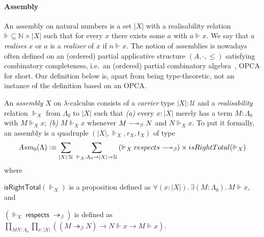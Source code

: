 \documentclass[a4paper,UKenglish,numberwithinsect,cleveref,thm-restate]{lipics-v2021}
\newcommand{\Asm}{\mathsf{Asm}}
\newcommand{\defeq}{\vcentcolon\equiv}
\newcommand{\Univ}{\mathcal{U}}
\DeclareRobustCommand\longtwoheadrightarrow{\relbar\joinrel\twoheadrightarrow}
\newcommand{\reduce}{\longtwoheadrightarrow_{\beta}}
\theoremstyle{plain}
\begin{document}
\paragraph*{Assembly}
An assembly on natural numbers is a set $|X|$ with a realisability relation $\mathord{\Vdash} \subseteq \mathbb{N} \times |X|$ such that for every $x$ there exists some $a$ with $a \Vdash x$. We say that $a$ \emph{realises} $x$ or $a$ is a \emph{realiser} of $x$ if $n \Vdash x$.
The notion of assemblies is nowadays often defined on an (ordered) partial applicative structure $(A, \cdot, \leq)$ satisfying combinatory completeness, i.e.\ an (ordered) partial combinatory algebra~\cite{Oosten2008}, OPCA for short.
Our definition below is, apart from being type-theoretic, not an instance of the definition based on an OPCA.
\begin{definition}\label{def:assembly}
  An \emph{assembly} $X$ on $\lambda$-calculus consists of a \emph{carrier} type $|X| : \Univ$ and a \emph{realisability} relation ${\Vdash_X}$ from $\Lambda_0$ to $|X|$ such that
  \emph{(a)} every $x : |X|$ merely has a term $M : \Lambda_0$ with $M \Vdash_X x$;
  \emph{(b)} $M \Vdash_X x$ whenever $M \reduce N$ and $N \Vdash_X x$.
  To put it formally, an assembly is a quadruple $(|X|, \Vdash_X, r_X, t_X)$ of type
  \[
    \Asm_0(\Lambda) \defeq \sum_{|X| : \Univ}\;\sum_{\mathord{\Vdash_X}:\Lambda_0 \to |X| \to \Univ} 
    \left(\mathord{\Vdash_X}\;\mathsf{respects}\;\mathord{\reduce}\right)
      \times \mathsf{isRightTotal}({\Vdash_X})
  \]
  where
  \begin{romanenumerate}
    \item $\mathsf{isRightTotal}(\Vdash_X)$ is a proposition defined as $\forall (x : |X|).\, \exists (M : \Lambda_0).\, M \Vdash x$, and

    \item $\left(\mathord{\Vdash_X}\;\mathsf{respects}\;\mathord{\twoheadrightarrow_\beta}\right)$ is defined as $\prod_{M N : \Lambda_0} \prod_{x : |X|} \left( \left(M \twoheadrightarrow_
\beta N\right) \to N \Vdash x \to M \Vdash x \right) $.
  \end{romanenumerate}
\end{definition}
\end{document}
